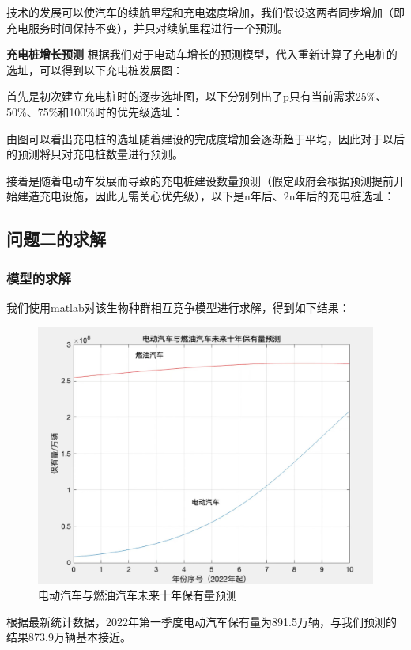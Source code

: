 \documentclass[12pt, a4paper, oneside]{ctexart}
\begin{document}
技术的发展可以使汽车的续航里程和充电速度增加，我们假设这两者同步增加（即充电服务时间保持不变），并只对续航里程进行一个预测。

\textbf{充电桩增长预测}
根据我们对于电动车增长的预测模型，代入重新计算了充电桩的选址，可以得到以下充电桩发展图：

首先是初次建立充电桩时的逐步选址图，以下分别列出了p只有当前需求25\%、50\%、75\%和100\%时的优先级选址：


由图可以看出充电桩的选址随着建设的完成度增加会逐渐趋于平均，因此对于以后的预测将只对充电桩数量进行预测。

接着是随着电动车发展而导致的充电桩建设数量预测（假定政府会根据预测提前开始建造充电设施，因此无需关心优先级），以下是n年后、2n年后的充电桩选址：


\subsection{问题二的求解}
\subsubsection{模型的求解}

我们使用matlab对该生物种群相互竞争模型进行求解，得到如下结果：

\begin{figure}[H]
  \centering
  \includegraphics[width=\textwidth]{pic/911652953505_.pic.jpg}
  \caption{电动汽车与燃油汽车未来十年保有量预测}
  \label{fig:电动汽车与燃油汽车未来十年保有量预测}
\end{figure}

根据最新统计数据，2022年第一季度电动汽车保有量为891.5万辆，与我们预测的结果873.9万辆基本接近。
\end{document}
